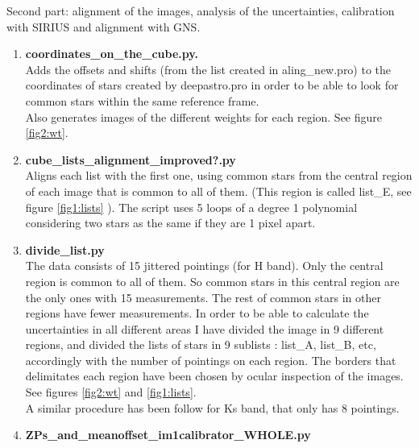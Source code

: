\documentclass[4paper,11pt]{report}
\begin{document}
Second part: alignment of the images, analysis of the uncertainties, calibration with SIRIUS and alignment with GNS.
\begin{enumerate}
\item \textbf{coordinates\_on\_the\_cube.py.} \\
Adds the offsets and shifts (from the list created in aling\_new.pro) to the coordinates of stars created by deepastro.pro in order to be able to look for common stars within the same reference frame. \\
Also generates images of the different weights for each region. See figure \ref{fig2:wt}.

\item \textbf{cube\_lists\_alignment\_improved?.py} \\
Aligns each list with the first one, using common stars from the central region of each image that is common to all of them. (This region is called list\_E, see figure  \ref{fig1:lists} ).
The script uses 5 loops of a degree 1 polynomial considering two stars as the same if they are 1 pixel apart.\\

\item \textbf{divide\_list.py} \\
The data consists of 15 jittered pointings (for H band). Only the central region is common to all of them. So common stars in this central region are the only ones with 15 measurements. The rest of common stars in other regions have fewer measurements. In order to be able to calculate the uncertainties in all different  areas  I have divided the image in 9 different regions, and divided the lists of stars in 9 sublists : list\_A, list\_B, etc, accordingly with the number of pointings on each region. The borders that delimitates each region have been chosen by ocular inspection of the images. See figures \ref{fig2:wt} and \ref{fig1:lists}.\\
A similar procedure has been follow for Ks band, that only has 8 pointings.


\item \textbf{ZPs\_and\_meanoffset\_im1calibrator\_WHOLE.py} 


\end{enumerate}
\end{document}
